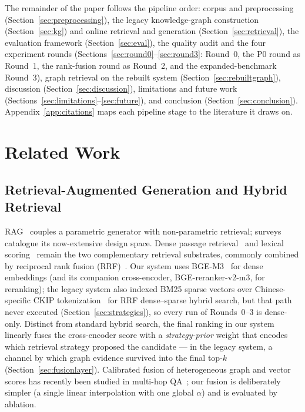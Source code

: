 The remainder of the paper follows the pipeline order: corpus and
preprocessing (Section~\ref{sec:preprocessing}), the legacy
knowledge-graph construction (Section~\ref{sec:kg}) and online retrieval
and generation (Section~\ref{sec:retrieval}), the evaluation framework
(Section~\ref{sec:eval}), the quality audit and the four experiment
rounds (Sections~\ref{sec:round0}--\ref{sec:round3}: Round~0, the P0
round as Round~1, the rank-fusion round as Round~2, and the
expanded-benchmark Round~3), graph retrieval on the rebuilt system
(Section~\ref{sec:rebuiltgraph}), discussion
(Section~\ref{sec:discussion}), limitations and future work
(Sections~\ref{sec:limitations}--\ref{sec:future}), and conclusion
(Section~\ref{sec:conclusion}). Appendix~\ref{app:citations} maps each
pipeline stage to the literature it draws on.

\section{Related Work}
\label{sec:related}

\subsection{Retrieval-Augmented Generation and Hybrid Retrieval}

RAG~\cite{lewis2020rag} couples a parametric generator with non-parametric
retrieval; surveys~\cite{gao2023ragsurvey} catalogue its now-extensive
design space. Dense passage retrieval~\cite{karpukhin2020dpr} and lexical
scoring~\cite{robertson2009bm25} remain the two complementary retrieval
substrates, commonly combined by reciprocal rank fusion
(RRF)~\cite{cormack2009rrf}. Our system uses BGE-M3~\cite{chen2024bgem3}
for dense embeddings (and its companion cross-encoder,
BGE-reranker-v2-m3, for reranking); the legacy system also indexed BM25
sparse vectors over Chinese-specific CKIP tokenization~\cite{ckip} for
RRF dense--sparse hybrid search, but that path never executed
(Section~\ref{sec:strategies}), so every run of Rounds~0--3 is dense-only.
Distinct from standard hybrid search, the final ranking in
our system linearly fuses the cross-encoder score with a
\emph{strategy-prior} weight that encodes which retrieval strategy
proposed the candidate --- in the legacy system, a channel by which graph
evidence survived into the final top-$k$ (Section~\ref{sec:fusionlayer}). Calibrated fusion of
heterogeneous graph and vector scores has recently been studied in
multi-hop QA~\cite{bacellar2026calibrated}; our fusion is deliberately
simpler (a single linear interpolation with one global $\alpha$) and is
evaluated by ablation.

